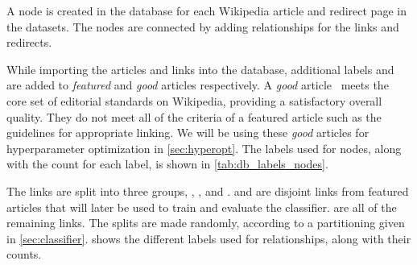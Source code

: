 A node is created in the database for each Wikipedia article and redirect page in the datasets. The nodes are connected by adding relationships for the links and redirects.

While importing the articles and links into the database, additional labels  and  are added to \emph{featured} and \emph{good} articles respectively. A \emph{good} article~\cite{wiki-good-articles} meets the core set of editorial standards on Wikipedia, providing a satisfactory overall quality. They do not meet all of the criteria of a featured article such as the guidelines for appropriate linking. We will be using these \emph{good} articles for hyperparameter optimization in \cref{sec:hyperopt}. The labels used for nodes, along with the count for each label, is shown in \cref{tab:db_labels_nodes}.

The links are split into three groups, , , and .  and  are disjoint links from featured articles that will later be used to train and evaluate the classifier.  are all of the remaining links. The splits are made randomly, according to a partitioning given in \cref{sec:classifier}.  shows the different labels used for relationships, along with their counts.


